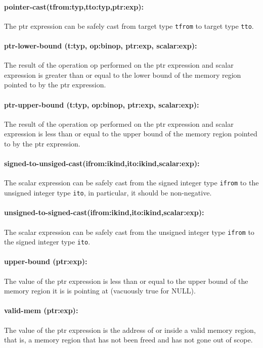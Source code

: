 \documentclass[11pt]{article}
\begin{document}
\paragraph{pointer-cast(tfrom:typ,tto:typ,ptr:exp):}
The ptr expression can be safely cast from target type {\tt tfrom} to
target type {\tt tto}.

\paragraph{ptr-lower-bound (t:typ, op:binop, ptr:exp, scalar:exp):}
The result of the operation op performed on the ptr expression and scalar expression
is greater than or equal to the lower bound of the memory region pointed to by
the ptr expression.

\paragraph{ptr-upper-bound (t:typ, op:binop, ptr:exp, scalar:exp):}
The result of the operation op performed on the ptr expression and scalar expression
is less than or equal to the upper bound of the memory region pointed to by the ptr
expression.

\paragraph{signed-to-unsiged-cast(ifrom:ikind,ito:ikind,scalar:exp):}
The scalar expression can be safely cast from the signed integer type {\tt ifrom}
to the unsigned integer type {\tt ito}, in particular, it should be non-negative.

\paragraph{unsigned-to-signed-cast(ifrom:ikind,ito:ikind,scalar:exp):}
The scalar expression can be safely cast from the unsigned integer type {\tt ifrom}
to the signed integer type {\tt ito}.

\paragraph{upper-bound (ptr:exp):}
The value of the ptr expression is less than or equal to the
    upper bound of the memory region it is is pointing at (vacuously true for NULL).

\paragraph{valid-mem (ptr:exp): }
The value of the ptr expression is the address of or inside a 
	valid memory region, that is, a memory region that has not been freed and
	has not gone out of scope.
	
\end{document}

